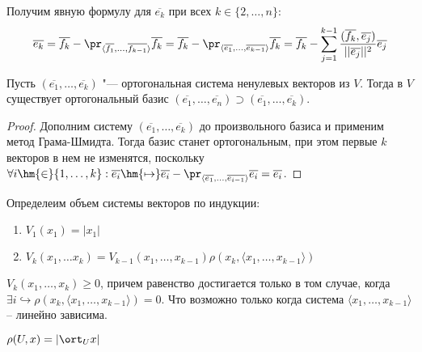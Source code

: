 \begin{note}
    Получим явную формулу для $\overline{e_k}$ при всех $k \in \{2, \dots, n\}$:
    \[\overline{e_k} = \overline{f_k} - \pr_{\langle\overline{f_1}, \dots, \overline{f_{k - 1}}\rangle}{\overline{f_k}} = \overline{f_k} - \pr_{\langle\overline{e_1}, \dots, \overline{e_{k - 1}}\rangle}{\overline{f_k}} = \overline{f_k} - \sum_{j = 1}^{k - 1}\frac{(\overline{f_k}, \overline{e_j})}{||\overline{e_j}||^2}\overline{e_j}\]
\end{note}

\begin{corollary}
    Пусть $(\overline{e_1}, \dots, \overline{e_k})$ "--- ортогональная система ненулевых векторов из $V$. Тогда в $V$ существует ортогональный базис $(\overline{e_1}, \dots, \overline{e_n}) \supset (\overline{e_1}, \dots, \overline{e_k})$.
\end{corollary}

\begin{proof}
    Дополним систему $(\overline{e_1}, \dots, \overline{e_k})$ до произвольного базиса и применим метод Грама-Шмидта. Тогда базис станет ортогональным, при этом первые $k$ векторов в нем не изменятся, поскольку $\forall i \hm{\in} \{1, \dots, k\}: \overline{e_i} \hm{\mapsto} \overline{e_i} - \pr_{\langle\overline{e_1}, \dots, \overline{e_{i - 1}}\rangle}{\overline{e_i}} = \overline{e_i}$.
\end{proof}

\begin{definition}
    Определеим объем системы векторов по индукции:
    \begin{enumerate}
        \item $V_1(x_1) = |x_1|$
        \item $V_k(x_1, \dots x_k) = V_{k -1} (x_1, \dots, x_{k - 1}) \rho(x_k, \langle x_1, \dots, x_{k - 1} \rangle)$
    \end{enumerate}
\end{definition}

\begin{corollary}
    $V_k(x_1, \dots, x_k) \geq 0$, причем равенство достигается только в том случае, когда $\exists i \hookrightarrow \rho(x_k, \langle x_1, \dots, x_{k - 1} \rangle) = 0$. Что возможно только когда система $\langle x_1, \dots, x_{k - 1} \rangle$ -- линейно зависима.
\end{corollary}

\begin{proposition}
    $\rho (U, x) = |\ort_U x|$
\end{proposition}

